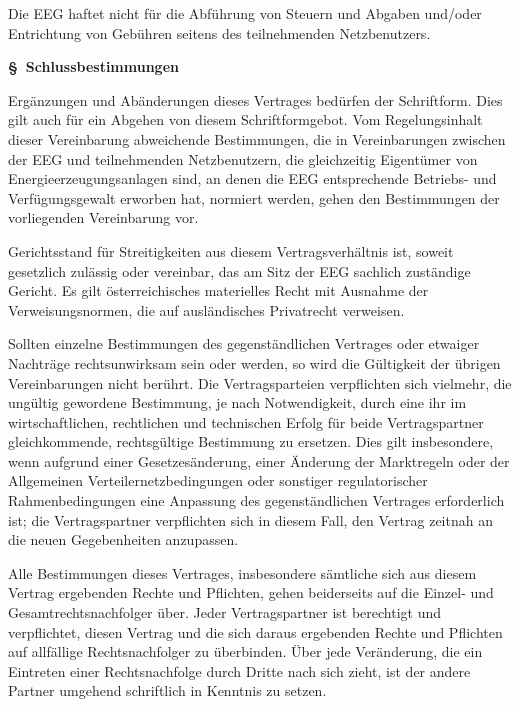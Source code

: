 \documentclass[a4paper,11pt]{article}
\newcounter{parasec}
\newcommand{\parasec}[1]{%
  \stepcounter{parasec}%
  \par\Needspace*{5\baselineskip}%
  \bigskip
  {\large\bfseries\color{tuerkis}\S\ \theparasec\quad #1}\par\nopagebreak
  \smallskip\nopagebreak
}
\begin{document}
Die EEG haftet nicht für die Abführung von Steuern und Abgaben und/oder Entrichtung von Gebühren seitens des teilnehmenden Netzbenutzers.

\parasec{Schlussbestimmungen}

Ergänzungen und Abänderungen dieses Vertrages bedürfen der Schriftform. Dies gilt auch für ein Abgehen von diesem Schriftformgebot. Vom Regelungsinhalt dieser Vereinbarung abweichende Bestimmungen, die in Vereinbarungen zwischen der EEG und teilnehmenden Netzbenutzern, die gleichzeitig Eigentümer von Energieerzeugungsanlagen sind, an denen die EEG entsprechende Betriebs- und Verfügungsgewalt erworben hat, normiert werden, gehen den Bestimmungen der vorliegenden Vereinbarung vor.

Gerichtsstand für Streitigkeiten aus diesem Vertragsverhältnis ist, soweit gesetzlich zulässig oder vereinbar, das am Sitz der EEG sachlich zuständige Gericht. Es gilt österreichisches materielles Recht mit Ausnahme der Verweisungsnormen, die auf ausländisches Privatrecht verweisen.

Sollten einzelne Bestimmungen des gegenständlichen Vertrages oder etwaiger Nachträge rechtsunwirksam sein oder werden, so wird die Gültigkeit der übrigen Vereinbarungen nicht berührt. Die Vertragsparteien verpflichten sich vielmehr, die ungültig gewordene Bestimmung, je nach Notwendigkeit, durch eine ihr im wirtschaftlichen, rechtlichen und technischen Erfolg für beide Vertragspartner gleichkommende, rechtsgültige Bestimmung zu ersetzen. Dies gilt insbesondere, wenn aufgrund einer Gesetzesänderung, einer Änderung der Marktregeln oder der Allgemeinen Verteilernetzbedingungen oder sonstiger regulatorischer Rahmenbedingungen eine Anpassung des gegenständlichen Vertrages erforderlich ist; die Vertragspartner verpflichten sich in diesem Fall, den Vertrag zeitnah an die neuen Gegebenheiten anzupassen.

Alle Bestimmungen dieses Vertrages, insbesondere sämtliche sich aus diesem Vertrag ergebenden Rechte und Pflichten, gehen beiderseits auf die Einzel- und Gesamtrechtsnachfolger über. Jeder Vertragspartner ist berechtigt und verpflichtet, diesen Vertrag und die sich daraus ergebenden Rechte und Pflichten auf allfällige Rechtsnachfolger zu überbinden. Über jede Veränderung, die ein Eintreten einer Rechtsnachfolge durch Dritte nach sich zieht, ist der andere Partner umgehend schriftlich in Kenntnis zu setzen.
\end{document}
